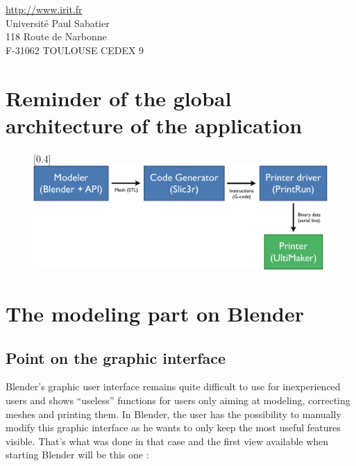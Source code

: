 \documentclass{article}
\begin{document}
\begin{center}
\url{http://www.irit.fr}\\
Université Paul Sabatier \\
118 Route de Narbonne \\
F-31062 TOULOUSE CEDEX 9
\end{center}

\thispagestyle{empty}

\newpage

\tableofcontents

\newpage

\section{Reminder of the global architecture of the application}


\begin{figure}[!h]
\begin{center}
\scalebox{0.4}[0.4]{\includegraphics{./Images/schema}}
\end{center}
\end{figure}

\newpage

\section{The modeling part on Blender}

\subsection{Point on the graphic interface}

Blender's graphic user interface remains quite difficult to use for inexperienced users and shows ``useless'' functions for users only aiming at modeling, correcting meshes and printing them. In Blender, the user has the possibility to manually modify this graphic interface as he wants to only keep the most useful features visible. That's what was done in that case and the first view available when starting Blender will be this one : 
\bigskip
\bigskip
\end{document}
